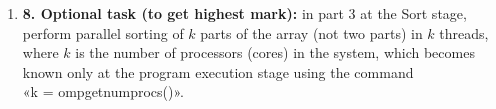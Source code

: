 {\begin{enumerate}
			\begin{itemize}
				\item Use the minimum measurement of ten received ones; 
				\item Calculate the confidence interval with a confidence level of 95\% based on ten dimensions.
			\end{itemize}
			Give graphs of parallel acceleration for both methods in the same coordinate system, furthermore, giving the lower and upper bounds of the confidence interval by two independent graphs is advisable.
		\item\textbf{8.	Optional task (to get highest mark):} in part 3 at the Sort stage, perform parallel sorting of $k$ parts of the array (not two parts) in $k$ threads, where $k$ is the number of processors (cores) in the system, which becomes known only at the program execution stage using the command \\«k = omp\textunderscore get\textunderscore num\textunderscore procs()».
	\end{enumerate}
}